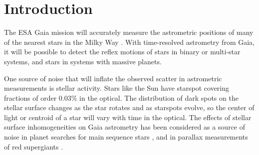 
\section{Introduction}

The ESA Gaia mission will accurately measure the astrometric positions of many of the nearest stars in the Milky Way \citep{Gaia2016b}. With time-resolved astrometry from Gaia, it will be possible to detect the reflex motions of stars in binary or multi-star systems, and stars in systems with massive planets.



One source of noise that will inflate the observed scatter in astrometric measurements is stellar activity. Stars like the Sun have starspot covering fractions of order 0.03\% in the optical. The distribution of dark spots on the stellar surface changes as the star rotates and as starspots evolve, so the center of light or centroid of a star will vary with time in the optical. The effects of stellar surface inhomogeneities on Gaia astrometry has been considered as a source of noise in planet searches for main sequence stars \citep{Eriksson2007, Catanzarite2008, Lanza2008}, and in parallax measurements of red supergiants \citep{Chiavassa2011}. 

